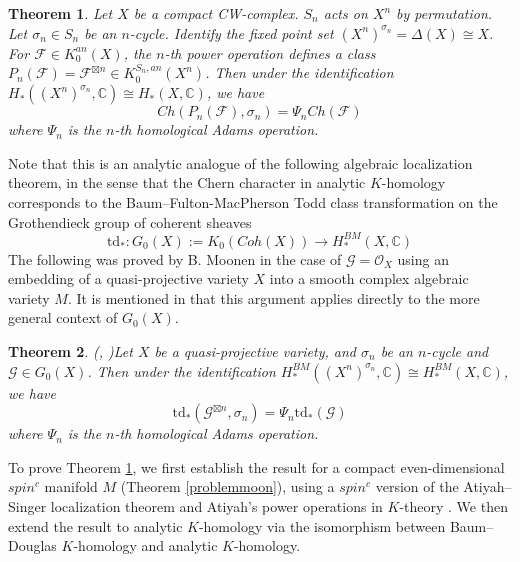 \documentclass[11pt,leqno,twoside]{amsart}
\theoremstyle{plainsl}
\newtheorem{theorem}{Theorem}[section]
\theoremstyle{definition}
\newcommand{\td}{\mathrm{td}}
\begin{document}
\begin{theorem} \label{analyticmoonen}
      Let $X$ be a compact CW-complex. $S_n$ acts on $X^n$ by permutation. Let $\sigma_n\in S_n$ be an $n$-cycle. Identify the fixed point set $(X^n)^{\sigma_n}=\Delta(X) \cong X$. For $\mathcal{F}\in K_0^{an}(X)$, the $n$-th power operation
defines a class   $ P_n(\mathcal{F})=\mathcal{F}^{\boxtimes n} \in K_0^{{S_n},an}(X^n)$.  Then under the identification $H_*((X^n)^{\sigma_n},\mathbb{C})\cong H_*(X,\mathbb{C})$, we have
\begin{equation}\label{eqanalyticmoonen}
    Ch(P_n(\mathcal{F}),\sigma_n)=\Psi_n Ch(\mathcal{F})
\end{equation} 
where $\Psi_n$ is the $n$-th homological Adams operation. 
\end{theorem}











Note that this is an analytic analogue of the following algebraic localization theorem, in the sense that the Chern character in analytic $K$-homology  corresponds to the Baum--Fulton-MacPherson Todd class transformation \cite{BFM} on the Grothendieck group of coherent sheaves $$\td_*:G_0(X):=K_0(Coh(X))\rightarrow H^{BM}_*(X,\mathbb{C})$$ The following was proved by B. Moonen in the case of $\mathcal{G}=\mathcal{O}_X$ using an embedding of a quasi-projective variety $X$ into a smooth complex algebraic variety $M$. It is mentioned in \cite{CMSSY} that this argument applies directly to the more general context of $G_0(X)$.
\begin{theorem} (\cite{M},  \cite[Lemma 3.6]{CMSSY})\label{algebraic_moonen} Let \(X\) be a quasi-projective variety, and  $\sigma_n$ be an $n$-cycle and $\mathcal{G}\in G_0(X)$. Then under the identification $H^{BM}_*((X^n)^{\sigma_n},\mathbb{C})\cong H^{BM}_*(X,\mathbb{C})$, we have
\begin{equation}\label{moonentdeq}
    \td_{*}(\mathcal{G}^{\boxtimes n},\sigma_n)=\Psi_n\td_{*}(\mathcal{G})
\end{equation}
where $\Psi_n$ is the $n$-th homological Adams operation. 
\end{theorem}


To prove Theorem \ref{analyticmoonen}, we first establish the result for a compact even-dimensional $spin^c$ manifold $M$ (Theorem \ref{problemmoon}), using a $spin^c$ version of the Atiyah--Singer localization theorem \cite{AS3} and Atiyah's power operations in $K$-theory \cite{At}. We then extend the result to analytic $K$-homology via the isomorphism between Baum--Douglas $K$-homology \cite{BD} and analytic $K$-homology.
\end{document}
